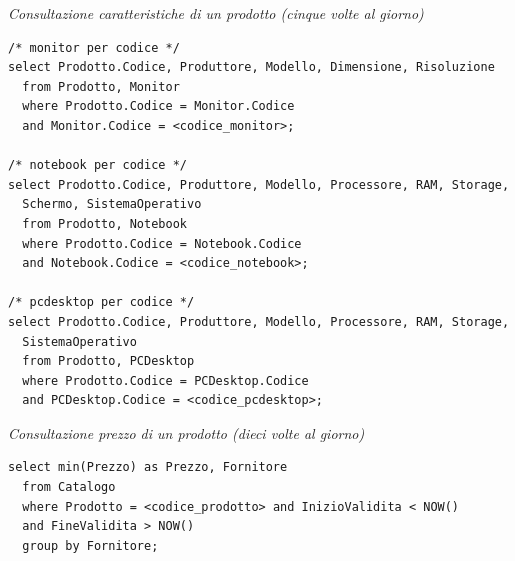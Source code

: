 \noindent\textit{Consultazione caratteristiche di un prodotto (cinque volte al giorno)}
\begin{verbatim}
/* monitor per codice */
select Prodotto.Codice, Produttore, Modello, Dimensione, Risoluzione
  from Prodotto, Monitor
  where Prodotto.Codice = Monitor.Codice
  and Monitor.Codice = <codice_monitor>;

/* notebook per codice */
select Prodotto.Codice, Produttore, Modello, Processore, RAM, Storage,
  Schermo, SistemaOperativo
  from Prodotto, Notebook
  where Prodotto.Codice = Notebook.Codice
  and Notebook.Codice = <codice_notebook>;

/* pcdesktop per codice */
select Prodotto.Codice, Produttore, Modello, Processore, RAM, Storage,
  SistemaOperativo
  from Prodotto, PCDesktop
  where Prodotto.Codice = PCDesktop.Codice
  and PCDesktop.Codice = <codice_pcdesktop>;
\end{verbatim}
\vspace{0.5cm}

\noindent{}
\newline\newline

\noindent\textit{Consultazione prezzo di un prodotto (dieci volte al giorno)}
\begin{verbatim}
select min(Prezzo) as Prezzo, Fornitore
  from Catalogo
  where Prodotto = <codice_prodotto> and InizioValidita < NOW()
  and FineValidita > NOW()
  group by Fornitore;
\end{verbatim}
\vspace{0.5cm}

\noindent{}
\newline\newline

